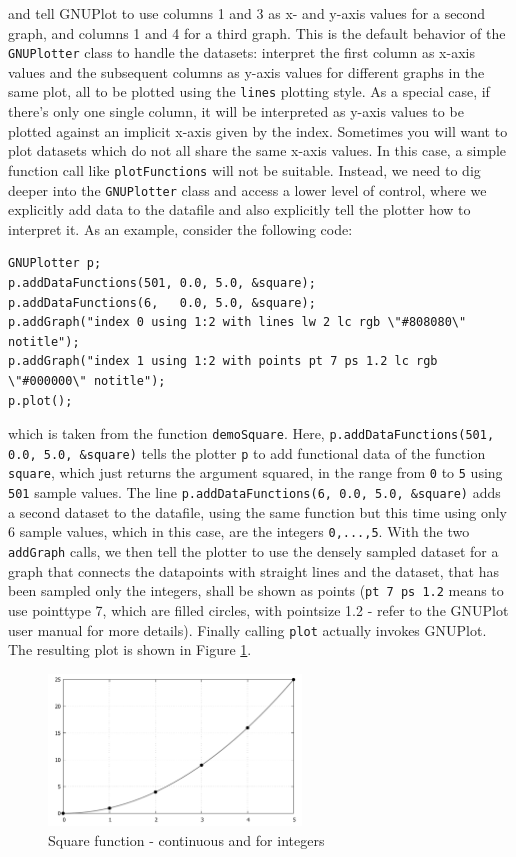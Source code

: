 \documentclass[11pt]{article}
\begin{document}
and tell GNUPlot to use columns 1 and 3 as x- and y-axis values for a second graph, and columns 1 and 4 for a third graph. This is the default behavior of the \texttt{GNUPlotter} class to handle the datasets: interpret the first column as x-axis values and the subsequent columns as y-axis values for different graphs in the same plot, all to be plotted using the \texttt{lines} plotting style. As a special case, if there's only one single column, it will be interpreted as y-axis values to be plotted against an implicit x-axis given by the index. Sometimes you will want to plot datasets which do not all share the same x-axis values. In this case, a simple function call like \texttt{plotFunctions} will not be suitable. Instead, we need to dig deeper into the \texttt{GNUPlotter} class and access a lower level of control, where we explicitly add data to the datafile and also explicitly tell the plotter how to interpret it. As an example, consider the following code:
\begin{verbatim}
GNUPlotter p;
p.addDataFunctions(501, 0.0, 5.0, &square);
p.addDataFunctions(6,   0.0, 5.0, &square);
p.addGraph("index 0 using 1:2 with lines lw 2 lc rgb \"#808080\" notitle");
p.addGraph("index 1 using 1:2 with points pt 7 ps 1.2 lc rgb \"#000000\" notitle");
p.plot();
\end{verbatim}
which is taken from the function \texttt{demoSquare}. Here, \texttt{p.addDataFunctions(501, 0.0, 5.0, \&square)} tells the plotter \texttt{p} to add functional data of the function \texttt{square}, which just returns the argument squared, in the range from \texttt{0} to \texttt{5} using \texttt{501} sample values. The line \texttt{p.addDataFunctions(6, 0.0, 5.0, \&square)} adds a second dataset to the datafile, using the same function but this time using only 6 sample values, which in this case, are the integers \texttt{0,...,5}. With the two \texttt{addGraph} calls, we then tell the plotter to use the densely sampled dataset for a graph that connects the datapoints with straight lines and the dataset, that has been sampled only the integers, shall be shown as points (\texttt{pt 7 ps 1.2} means to use pointtype 7, which are filled circles, with pointsize 1.2 - refer to the GNUPlot user manual for more details). Finally calling \texttt{plot} actually invokes GNUPlot. The resulting plot is shown in Figure \ref{fig:Square}.
\begin{figure}[h!]
	\centering
  	\includegraphics[width=0.60\textwidth]{Plots/Square.pdf}
	\caption{Square function - continuous and for integers}
	\label{fig:Square}
\end{figure}
\end{document}
